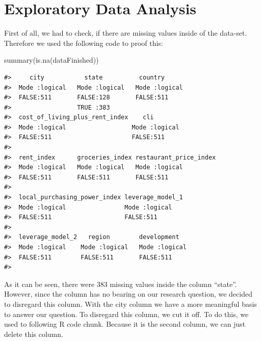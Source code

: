 \documentclass[
  11pt,
  a4paper,
  twoside]{scrbook}
\newenvironment{Shaded}{\begin{snugshade}}{\end{snugshade}}
\newcommand{\FunctionTok}[1]{\textcolor[rgb]{0.00,0.00,0.00}{#1}}
\newcommand{\NormalTok}[1]{#1}
\begin{document}
\hypertarget{exploratory-data-analysis}{%
\section{Exploratory Data Analysis}\label{exploratory-data-analysis}}

First of all, we had to check, if there are missing values inside of the data-set. Therefore we used the following code to proof this:

\linespread{1}

\begin{Shaded}
\begin{Highlighting}[]
\FunctionTok{summary}\NormalTok{(}\FunctionTok{is.na}\NormalTok{(dataFinished))}
\end{Highlighting}
\end{Shaded}

\linespread{1}

\begin{verbatim}
#>     city           state          country       
#>  Mode :logical   Mode :logical   Mode :logical  
#>  FALSE:511       FALSE:128       FALSE:511      
#>                  TRUE :383                      
#>  cost_of_living_plus_rent_index    cli         
#>  Mode :logical                  Mode :logical  
#>  FALSE:511                      FALSE:511      
#>                                                
#>  rent_index      groceries_index restaurant_price_index
#>  Mode :logical   Mode :logical   Mode :logical         
#>  FALSE:511       FALSE:511       FALSE:511             
#>                                                        
#>  local_purchasing_power_index leverage_model_1
#>  Mode :logical                Mode :logical   
#>  FALSE:511                    FALSE:511       
#>                                               
#>  leverage_model_2   region        development    
#>  Mode :logical    Mode :logical   Mode :logical  
#>  FALSE:511        FALSE:511       FALSE:511      
#> 
\end{verbatim}

As it can be seen, there were \(383\) missing values inside the column ``state''.
However, since the column has no bearing on our research question, we decided to disregard this column. With the city column we have a more meaningful basis to answer our question.
To disregard this column, we cut it off. To do this, we used to following R code chunk. Because it is the second column, we can just delete this column.

\linespread{1}
\end{document}
